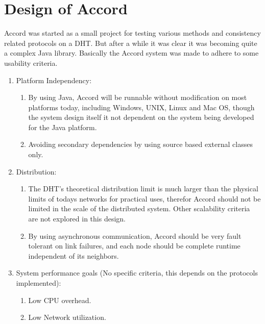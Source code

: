 \section{Design of Accord}
\label{sec:Design}

Accord was started as a small project for testing various methods and consistency
 related protocols on
 a DHT. But after a while it was clear it was becoming quite a complex Java library.
 Basically the Accord system was made to adhere to some usability criteria.

\begin{enumerate}
  \item Platform Independency:
  \begin{enumerate}
    \item By using Java, Accord will be runnable without modification on most platforms today,
      including Windows, UNIX, Linux and Mac OS, though the system design itself it not dependent
      on the system being developed for the Java platform.
    \item Avoiding secondary dependencies by using source based external classes only.
  \end{enumerate}
  \item Distribution:
  \begin{enumerate}
    \item The DHT's theoretical distribution limit is much larger than the physical limits
      of todays networks for practical uses, therefor Accord should not be limited in the
      scale of the distributed system. Other scalability criteria are not explored in this
      design.
    \item By using asynchronous communication, Accord should be very fault tolerant
      on link failures, and each node should be complete runtime independent of its neighbors.
  \end{enumerate}
  \item System performance goals (No specific criteria, this depends on the protocols implemented):
  \begin{enumerate}
    \item Low CPU overhead.
    \item Low Network utilization.
  \end{enumerate}
\end{enumerate}

